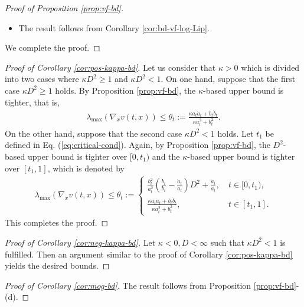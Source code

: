 \documentclass[twoside,11pt]{article}
\def\paref#1{(\ref{#1})}
\numberwithin{equation}{section}
\begin{document}
\begin{proof} [Proof of Proposition \ref{prop:vf-bd}]
\begin{itemize}
\item[(e)] The result follows from Corollary \ref{cor:bd-vf-log-Lip}.
\end{itemize}
We complete the proof.
\end{proof}



\begin{proof} [Proof of Corollary \ref{cor:pos-kappa-bd}]
    Let us consider that $\kappa > 0$ which is divided into two cases where $\kappa D^2 \ge 1$ and $\kappa D^2 < 1$.
    On one hand, suppose that the first case $\kappa D^2 \ge 1$ holds.
    By Proposition \ref{prop:vf-bd}, %
    the $\kappa$-based upper bound is tighter, that is,
    \begin{align*}
        \lambda_{\max} (\nabla_x v(t, x)) \le \theta_t := \frac{\kappa a_t \dot{a}_t + b_t \dot{b}_t} {\kappa a_t^2 + b_t^2}.
    \end{align*}
    On the other hand, suppose that the second case $\kappa D^2 < 1$ holds.
    Let $t_1$ be defined in Eq. \paref{eq:critical-cond}.
    Again, by Proposition \ref{prop:vf-bd},
    the $D^2$-based upper bound is tighter over $[0, t_1)$ and the $\kappa$-based upper bound is tighter over $[t_1, 1]$, which is denoted by
    \begin{align*}
        \lambda_{\max} (\nabla_x v(t, x)) \le \theta_t :=
        \begin{cases}
            \frac{b_t^2}{a_t^2} \left( \frac{\dot{b}_t}{b_t} - \frac{\dot{a}_t}{a_t} \right) D^2 + \frac{\dot{a}_t} {a_t}, \ &t \in [0, t_1), \\
            \frac{\kappa a_t \dot{a}_t + b_t \dot{b}_t} {\kappa a_t^2 + b_t^2},  \ &t \in [t_1, 1].
        \end{cases}
    \end{align*}
    This completes the proof.
\end{proof}


\begin{proof} [Proof of Corollary \ref{cor:neg-kappa-bd}]
    Let $\kappa < 0, D < \infty$ such that $\kappa D^2 < 1$ is fulfilled.
    Then an argument similar to the proof of Corollary \ref{cor:pos-kappa-bd} yields the desired bounds.
\end{proof}


\begin{proof} [Proof of Corollary \ref{cor:mog-bd}]
    The result follows from Proposition \ref{prop:vf-bd}-(d).
\end{proof}
\end{document}
